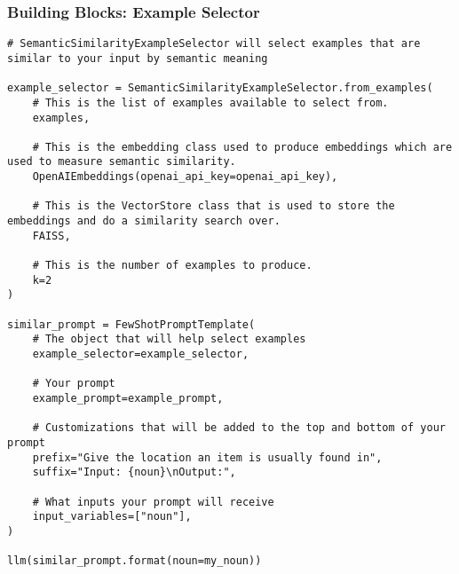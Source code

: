 \begin{frame}[fragile]\frametitle{Building Blocks: Example Selector}

\begin{lstlisting}
# SemanticSimilarityExampleSelector will select examples that are similar to your input by semantic meaning

example_selector = SemanticSimilarityExampleSelector.from_examples(
    # This is the list of examples available to select from.
    examples, 
    
    # This is the embedding class used to produce embeddings which are used to measure semantic similarity.
    OpenAIEmbeddings(openai_api_key=openai_api_key), 
    
    # This is the VectorStore class that is used to store the embeddings and do a similarity search over.
    FAISS, 
    
    # This is the number of examples to produce.
    k=2
)

similar_prompt = FewShotPromptTemplate(
    # The object that will help select examples
    example_selector=example_selector,
    
    # Your prompt
    example_prompt=example_prompt,
    
    # Customizations that will be added to the top and bottom of your prompt
    prefix="Give the location an item is usually found in",
    suffix="Input: {noun}\nOutput:",
    
    # What inputs your prompt will receive
    input_variables=["noun"],
)

llm(similar_prompt.format(noun=my_noun))
\end{lstlisting}	  
\end{frame}

